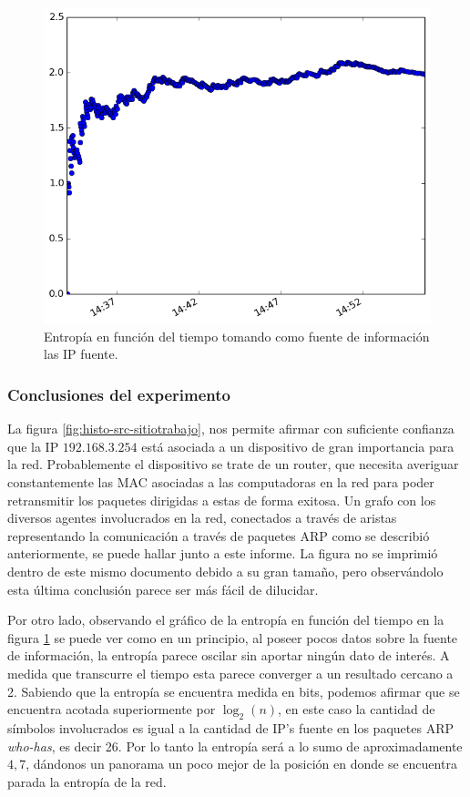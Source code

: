 \begin{figure}[H]
  \centering	
	\includegraphics[scale=0.66]{../experimentacion-agarassino/entropy_src.png}
  \caption{Entropía en función del tiempo tomando como fuente de información las IP fuente.}
	\label{fig:entropia-src-sitiotrabajo}
\end{figure}

\subsubsection{Conclusiones del experimento}
La figura \ref{fig:histo-src-sitiotrabajo}, nos permite afirmar con suficiente confianza que la IP $192.168.3.254$ está asociada a un dispositivo de gran importancia para la red. Probablemente el dispositivo se trate de un router, que necesita averiguar constantemente las MAC asociadas a las computadoras en la red para poder retransmitir los paquetes dirigidas a estas de forma exitosa. Un grafo con los diversos agentes involucrados en la red, conectados a través de aristas representando la comunicación a través de paquetes ARP como se describió anteriormente, se puede hallar junto a este informe. La figura no se imprimió dentro de este mismo documento debido a su gran tamaño, pero observándolo esta última conclusión parece ser más fácil de dilucidar. 

Por otro lado, observando el gráfico de la entropía en función del tiempo en la figura \ref{fig:entropia-src-sitiotrabajo} se puede ver como en un principio, al poseer pocos datos sobre la fuente de información, la entropía parece oscilar sin aportar ningún dato de interés. A medida que transcurre el tiempo esta parece converger a un resultado cercano a 2. Sabiendo que la entropía se encuentra medida en bits, podemos afirmar que se encuentra acotada superiormente por $\log_{2}(n)$, en este caso la cantidad de símbolos involucrados es igual a la cantidad de IP's fuente en los paquetes ARP \textit{who-has}, es decir 26.  Por lo tanto la entropía será a lo sumo de aproximadamente $4,7$, dándonos un panorama un poco mejor de la posición en donde se encuentra parada la entropía de la red.